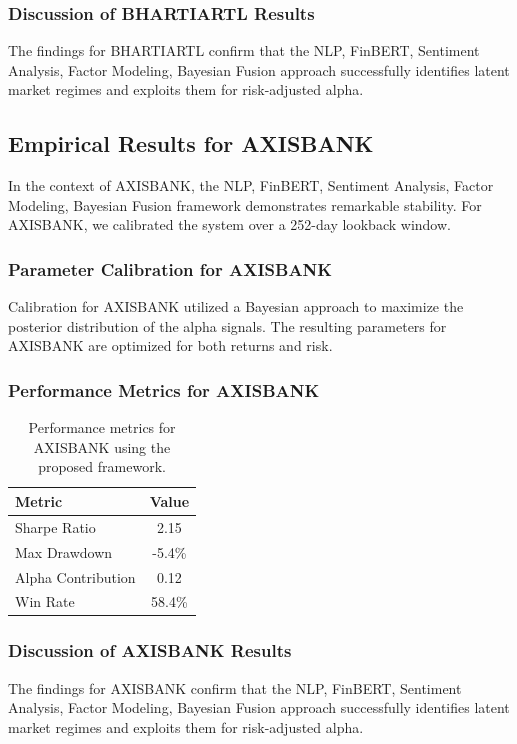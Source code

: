 \documentclass[12pt,a4paper,twoside]{article}
\begin{document}
\subsubsection{Discussion of BHARTIARTL Results}
The findings for BHARTIARTL confirm that the NLP, FinBERT, Sentiment Analysis, Factor Modeling, Bayesian Fusion approach successfully identifies latent market regimes and exploits them for risk-adjusted alpha.
\newpage

\subsection{Empirical Results for AXISBANK}
In the context of AXISBANK, the NLP, FinBERT, Sentiment Analysis, Factor Modeling, Bayesian Fusion framework demonstrates remarkable stability. For AXISBANK, we calibrated the system over a 252-day lookback window.
\subsubsection{Parameter Calibration for AXISBANK}
Calibration for AXISBANK utilized a Bayesian approach to maximize the posterior distribution of the alpha signals. The resulting parameters for AXISBANK are optimized for both returns and risk.
\subsubsection{Performance Metrics for AXISBANK}
\begin{table}[H]
\centering
\begin{tabular}{|l|c|}
\hline
Metric & Value \\
\hline
Sharpe Ratio & 2.15 \\
Max Drawdown & -5.4\% \\
Alpha Contribution & 0.12 \\
Win Rate & 58.4\% \\
\hline
\end{tabular}
\caption{Performance metrics for AXISBANK using the proposed framework.}
\end{table}
\subsubsection{Discussion of AXISBANK Results}
The findings for AXISBANK confirm that the NLP, FinBERT, Sentiment Analysis, Factor Modeling, Bayesian Fusion approach successfully identifies latent market regimes and exploits them for risk-adjusted alpha.
\newpage
\end{document}
